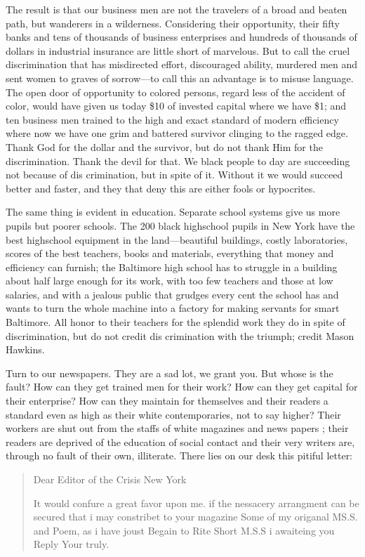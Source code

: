 \documentclass[letterpaper,10pt,english]{jupyterBook}
\begin{document}
\sphinxAtStartPar
The result is that our business men are not the travelers of a broad and beaten path, but wanderers in a wilderness. Considering their opportunity, their fifty banks and tens of thousands of business enterprises and hundreds of thousands of dollars in industrial insurance are little short of marvelous. But to call the cruel discrimination that has misdirected effort, discouraged ability, murdered men and sent women to graves of sorrow—to call this an advantage is to misuse language. The open door of opportunity to colored persons, regard­ less of the accident of color, would have given us to\sphinxhyphen{}day \$10 of invested capital where we have \$1; and ten business men trained to the high and exact standard of modern efficiency where now we have one grim and battered survivor clinging to the ragged edge. Thank God for the dollar and the survivor, but do not thank Him for the discrimination. Thank the devil for that. We black people to­ day are succeeding not because of dis­ crimination, but in spite of it. Without it we would succeed better and faster, and they that deny this are either fools or hypocrites.

\sphinxAtStartPar
The same thing is evident in education. Separate school systems give us more pupils but poorer schools. The 200 black high\sphinxhyphen{}school pupils in New York have the best high\sphinxhyphen{}school equipment in the land—beautiful buildings, costly laboratories, scores of the best teachers, books and materials, everything that money and efficiency can furnish; the Baltimore high school has to struggle in a building about half large enough for its work, with too few teachers and those at low salaries, and with a jealous public that grudges every cent the school has and wants to turn the whole machine into a factory for making servants for smart Baltimore. All honor to their teachers for the splendid work they do in spite of discrimination, but do not credit dis­ crimination with the triumph; credit Mason Hawkins.

\sphinxAtStartPar
Turn to our newspapers. They are a sad lot, we grant you. But whose is the fault? How can they get trained men for their work? How can they get capital for their enterprise? How can
they maintain for themselves and their readers a standard even as high as their white contemporaries, not to say higher? Their workers are shut out from the staffs of white magazines and news­ papers ; their readers are deprived of the education of social contact and their very writers are, through no fault of their own, illiterate. There lies on our desk this pitiful letter:
\begin{quote}

\sphinxAtStartPar
Dear Editor of the Crisis
New York

\sphinxAtStartPar
It would confure a great favor upon me. if the nessacery arrangment can be secured that i may constribet to your magazine Some of my origanal MS.S. and Poem, as i have joust Begain to Rite Short M.S.S i awaiteing you Reply
Your truly.
\end{quote}
\end{document}
